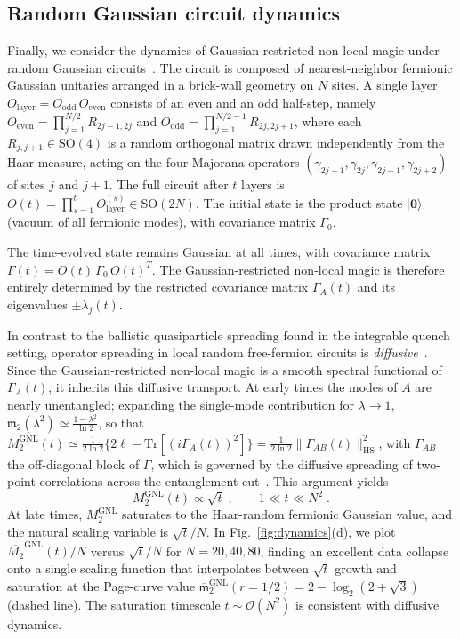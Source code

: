 \documentclass[prx,twocolumn,superscriptaddress,aps,10pt, frontmatterverbose, reprint,footinbib,longbibliography=true]{revtex4-2}
\begin{document}
\subsection{Random Gaussian circuit dynamics}
Finally, we consider the dynamics of Gaussian-restricted non-local magic under random Gaussian circuits~\cite{tirrito2025magicphasetransitionsmonitored}.
The circuit is composed of nearest-neighbor fermionic Gaussian unitaries arranged in a brick-wall geometry on $N$ sites.
A single layer $O_{\mathrm{layer}} = O_{\mathrm{odd}}\,O_{\mathrm{even}}$ consists of an even and an odd half-step, namely $O_{\mathrm{even}} = \prod_{j=1}^{N/2} R_{2j-1,2j}$ and $O_{\mathrm{odd}} = \prod_{j=1}^{N/2-1} R_{2j,2j+1}$, where each $R_{j,j+1} \in \mathrm{SO}(4)$ is a random orthogonal matrix drawn independently from the Haar measure, acting on the four Majorana operators $(\gamma_{2j-1}, \gamma_{2j}, \gamma_{2j+1}, \gamma_{2j+2})$ of sites $j$ and $j+1$.
The full circuit after $t$ layers is $O(t) = \prod_{s=1}^t O_{\mathrm{layer}}^{(s)} \in \mathrm{SO}(2N)$.
The initial state is the product state $|\mathbf{0}\rangle$ (vacuum of all fermionic modes), with covariance matrix $\Gamma_0$. 

The time-evolved state remains Gaussian at all times, with covariance matrix $\Gamma(t) = O(t)\,\Gamma_0\,O(t)^T$.
The Gaussian-restricted non-local magic is therefore entirely determined by the restricted covariance matrix $\Gamma_A(t)$ and its eigenvalues $\pm\lambda_j(t)$.

In contrast to the ballistic quasiparticle spreading found in the integrable quench setting, operator spreading in local random free-fermion circuits is \emph{diffusive}~\cite{dias2021diffusiveoperatorspreadingrandom,swann}.
Since the Gaussian-restricted non-local magic is a smooth spectral functional of $\Gamma_A(t)$, it inherits this diffusive transport.
At early times the modes of $A$ are nearly unentangled; expanding the single-mode contribution for $\lambda\to1$, $\mathfrak{m}_2(\lambda^2) \simeq \frac{1-\lambda^2}{\ln 2}$, so that $M_2^{\mathrm{GNL}}(t) \simeq \frac{1}{2\ln 2}\{2\ell-\mathrm{Tr}[(i\Gamma_A(t))^2]\}=\frac{1}{2\ln 2}\|\Gamma_{AB}(t)\|_{\mathrm{HS}}^2$, with $\Gamma_{AB}$ the off-diagonal block of $\Gamma$, which is governed by the diffusive spreading of two-point correlations across the entanglement cut~\cite{dias2021diffusiveoperatorspreadingrandom}.
This argument yields
\begin{equation}
    M_2^{\mathrm{GNL}}(t) \propto \sqrt{t}\;, \qquad 1 \ll t \ll N^2\;.
\end{equation}
At late times, $M_2^{\mathrm{GNL}}$ saturates to the Haar-random fermionic Gaussian value, and the natural scaling variable is $\sqrt{t}/N$.
In Fig.~\ref{fig:dynamics}(d), we plot $\overline{M_2}^{\mathrm{GNL}}(t)/N$ versus $\sqrt{t}/N$ for $N = 20, 40, 80$, finding an excellent data collapse onto a single scaling function that interpolates between $\sqrt{t}$ growth and saturation at the Page-curve value $\overline{\mathsf{m}}_{2}^{\mathrm{GNL}}(r=1/2)=2-\log_2(2+\sqrt{3})$  (dashed line).
The saturation timescale $t\sim\mathcal{O}(N^2)$ is consistent with diffusive dynamics.
\end{document}
